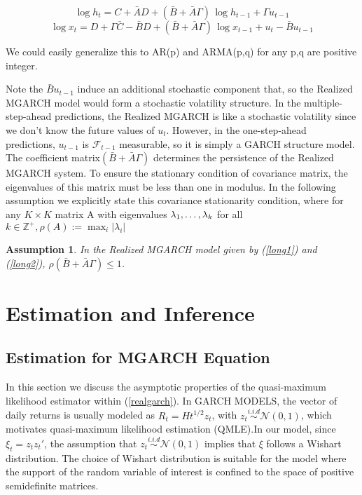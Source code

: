 \documentclass[titlepage,11pt]{article}
\newtheorem{assumption}{Assumption}
\begin{document}
\begin{equation}
\label{long1}
\log h_t=C+\bar{A} D+ (\bar{B}+\bar{A} \Gamma) \, \log h_{t-1}+ \Gamma u_{t-1}
\end{equation}
\begin{equation}
\label{long2}
\log x_t=D +\Gamma \bar{C}-\bar{B} D+ (\bar{B}+\bar{A}\Gamma)\, \log x_{t-1}+ u_t-\bar{B} u_{t-1}
\end{equation}


We could easily generalize this to AR(p) and ARMA(p,q) for any p,q are positive integer.

Note the $\bar{B} u_{t-1}$ induce an additional stochastic component that, so the Realized MGARCH model would form a stochastic volatility structure. In the multiple-step-ahead predictions, the Realized MGARCH is like a stochastic volatility since we don't know the future values of $u_t$. However, in the one-step-ahead predictions, $u_{t-1}$ is $\mathcal{F}_{t-1}$ measurable, so it is simply a GARCH structure model. 
The coefficient matrix$(\bar{B}+\bar{A}\Gamma)$ determines the persistence of the Realized MGARCH system. To ensure the stationary condition of covariance matrix, the eigenvalues of this matrix must be less than one in modulus. In the following assumption we explicitly state this covariance stationarity condition, where for any $K \times K$ matrix A with eigenvalues $\lambda_1,\mathellipsis,\lambda_k$ for all $k \in \mathbb{Z}^+, \rho(A) := \max_{i}|\lambda_i | $ 



\begin{assumption}
	\label{ass_stat}
	In the Realized MGARCH model given by (\ref{long1}) and (\ref{long2}), $\rho(\bar{B}+\bar{A}\Gamma) \le 1$.
\end{assumption}




\section{Estimation and Inference}
\subsection{Estimation for MGARCH Equation}
In this section we discuss the asymptotic properties of the quasi-maximum likelihood estimator within (\ref{realgarch}).  In GARCH MODELS, the vector of daily returns is usually modeled as $R_t=Ht^{1/2} z_t$, with $z_t \overset{i.i.d} {\sim} \mathcal{N}(0,1)$, which motivates quasi-maximum likelihood estimation (QMLE).In our model, since $\xi_t = z_t z_t'$, the assumption that $z_t \overset{i.i.d} {\sim} \mathcal{N}(0,1)$ implies that $\xi$ follows a Wishart distribution. The choice of Wishart distribution is suitable for the model where the support of the random variable of interest is confined to the space of positive semidefinite matrices. 
\end{document}
